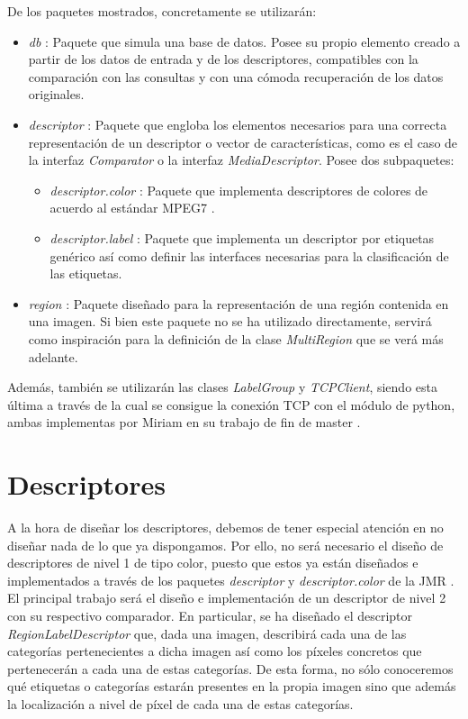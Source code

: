 De los paquetes mostrados, concretamente se utilizarán:
\begin{itemize}
\item \emph{db} : Paquete que simula una base de datos. Posee su propio elemento creado a partir de los datos de entrada y de los descriptores, compatibles con la comparación con las consultas y con una cómoda recuperación de los datos originales.
\item \emph{descriptor} : Paquete que engloba los elementos necesarios para una correcta representación de un descriptor o vector de características, como es el caso de la interfaz \emph{Comparator} o la interfaz \emph{MediaDescriptor}. Posee dos subpaquetes:
\begin{itemize}
\item \emph{descriptor.color} : Paquete que implementa descriptores de colores de acuerdo al estándar MPEG7 \cite{MPPEG7}.
\item \emph{descriptor.label} : Paquete que implementa un descriptor por etiquetas genérico así como definir las interfaces necesarias para la clasificación de las etiquetas.
\end{itemize}
\item \emph{region} : Paquete diseñado para la representación de una región contenida en una imagen. Si bien este paquete no se ha utilizado directamente, servirá como inspiración para la definición de la clase \emph{MultiRegion} que se verá más adelante.
\end{itemize}

Además, también se utilizarán las clases \emph{LabelGroup} y \emph{TCPClient}, siendo esta última a través de la cual se consigue la conexión TCP con el módulo de python, ambas implementas por Miriam en su trabajo de fin de master \cite{TFM}.

\newpage
\section{Descriptores}
A la hora de diseñar los descriptores, debemos de tener especial atención en no diseñar nada de lo que ya dispongamos. Por ello, no será necesario el diseño de descriptores de nivel 1 de tipo color, puesto que estos ya están diseñados e implementados a través de los paquetes \emph{descriptor} y \emph{descriptor.color} de la JMR \cite{JMR}.\\

El principal trabajo será el diseño e implementación de un descriptor de nivel 2 con su respectivo comparador. En particular, se ha diseñado el descriptor \emph{RegionLabelDescriptor} que, dada una imagen, describirá cada una de las categorías pertenecientes a dicha imagen así como los píxeles concretos que pertenecerán a cada una de estas categorías. De esta forma, no sólo conoceremos qué etiquetas o categorías estarán presentes en la propia imagen sino que además la localización a nivel de píxel de cada una de estas categorías.\\

